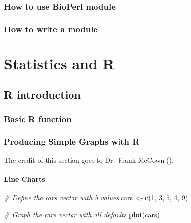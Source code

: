 \documentclass[]{book}
\makeatletter
\newenvironment{Shaded}{\begin{snugshade}}{\end{snugshade}}
\newcommand{\CommentTok}[1]{\textcolor[rgb]{0.56,0.35,0.01}{\textit{#1}}}
\newcommand{\DecValTok}[1]{\textcolor[rgb]{0.00,0.00,0.81}{#1}}
\newcommand{\KeywordTok}[1]{\textcolor[rgb]{0.13,0.29,0.53}{\textbf{#1}}}
\newcommand{\NormalTok}[1]{#1}
\newcommand{\StringTok}[1]{\textcolor[rgb]{0.31,0.60,0.02}{#1}}
\newenvironment{kframe}{%
\medskip{}
\setlength{\fboxsep}{.8em}
 \def\at@end@of@kframe{}%
 \ifinner\ifhmode%
  \def\at@end@of@kframe{\end{minipage}}%
  \begin{minipage}{\columnwidth}%
 \fi\fi%
 \def\FrameCommand##1{\hskip\@totalleftmargin \hskip-\fboxsep
 \colorbox{shadecolor}{##1}\hskip-\fboxsep
     \hskip-\linewidth \hskip-\@totalleftmargin \hskip\columnwidth}%
 \MakeFramed {\advance\hsize-\width
   \@totalleftmargin\z@ \linewidth\hsize
   \@setminipage}}%
 {\par\unskip\endMakeFramed%
 \at@end@of@kframe}
\renewenvironment{Shaded}{\begin{kframe}}{\end{kframe}}
\makeatother
\begin{document}
\hypertarget{how-to-use-bioperl-module}{%
\section{How to use BioPerl module}\label{how-to-use-bioperl-module}}

\hypertarget{how-to-write-a-module}{%
\section{How to write a module}\label{how-to-write-a-module}}

\hypertarget{part-statistics-and-r}{%
\part{Statistics and R}\label{part-statistics-and-r}}

\hypertarget{r-introduction}{%
\chapter{R introduction}\label{r-introduction}}

\hypertarget{basic-r-function}{%
\section{Basic R function}\label{basic-r-function}}

\hypertarget{producing-simple-graphs-with-r}{%
\section{Producing Simple Graphs with R}\label{producing-simple-graphs-with-r}}

The credit of this section goes to Dr.~Frank McCown (\citet{simpleGraphR}).

\hypertarget{line-charts}{%
\subsection{Line Charts}\label{line-charts}}

\begin{Shaded}
\begin{Highlighting}[]
\CommentTok{# Define the cars vector with 5 values}
\NormalTok{cars <-}\StringTok{ }\KeywordTok{c}\NormalTok{(}\DecValTok{1}\NormalTok{, }\DecValTok{3}\NormalTok{, }\DecValTok{6}\NormalTok{, }\DecValTok{4}\NormalTok{, }\DecValTok{9}\NormalTok{)}

\CommentTok{# Graph the cars vector with all defaults}
\KeywordTok{plot}\NormalTok{(cars)}
\end{Highlighting}
\end{Shaded}
\end{document}
